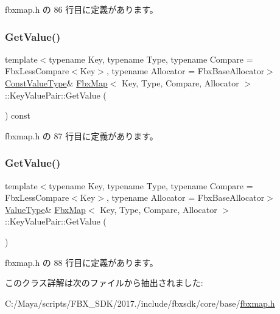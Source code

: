  fbxmap.\+h の 86 行目に定義があります。

\mbox{\label{class_fbx_map_1_1_key_value_pair_a42766d8323b96bc993df3f582ff35313}} 
\subsubsection{\texorpdfstring{Get\+Value()}{GetValue()}\hspace{0.1cm}{\footnotesize\ttfamily [1/2]}}
{\footnotesize\ttfamily template$<$typename Key, typename Type, typename Compare = Fbx\+Less\+Compare$<$\+Key$>$, typename Allocator = Fbx\+Base\+Allocator$>$ \\
\hyperlink{class_fbx_map_1_1_key_value_pair_a13d0030dcec9979f30273cc4ac6ed871}{Const\+Value\+Type}\& \hyperlink{class_fbx_map}{Fbx\+Map}$<$ Key, Type, Compare, Allocator $>$\+::Key\+Value\+Pair\+::\+Get\+Value (\begin{DoxyParamCaption}{ }\end{DoxyParamCaption}) const\hspace{0.3cm}{\ttfamily [inline]}}



 fbxmap.\+h の 87 行目に定義があります。

\mbox{\label{class_fbx_map_1_1_key_value_pair_ab06a5a6b1f2d03ae14a98a91cdfac643}} 
\subsubsection{\texorpdfstring{Get\+Value()}{GetValue()}\hspace{0.1cm}{\footnotesize\ttfamily [2/2]}}
{\footnotesize\ttfamily template$<$typename Key, typename Type, typename Compare = Fbx\+Less\+Compare$<$\+Key$>$, typename Allocator = Fbx\+Base\+Allocator$>$ \\
\hyperlink{class_fbx_map_1_1_key_value_pair_a716c83c1f6dabf173132b5acde84a9fe}{Value\+Type}\& \hyperlink{class_fbx_map}{Fbx\+Map}$<$ Key, Type, Compare, Allocator $>$\+::Key\+Value\+Pair\+::\+Get\+Value (\begin{DoxyParamCaption}{ }\end{DoxyParamCaption})\hspace{0.3cm}{\ttfamily [inline]}}



 fbxmap.\+h の 88 行目に定義があります。



このクラス詳解は次のファイルから抽出されました\+:\begin{DoxyCompactItemize}
\item 
C\+:/\+Maya/scripts/\+F\+B\+X\+\_\+\+S\+D\+K/2017./include/fbxsdk/core/base/\hyperlink{fbxmap_8h}{fbxmap.\+h}\end{DoxyCompactItemize}
